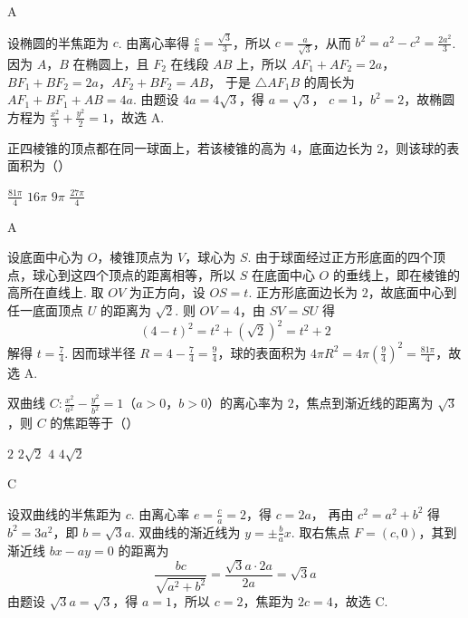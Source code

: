 \begin{answer}
A
\end{answer}

\begin{solution}
设椭圆的半焦距为 \(c\). 由离心率得
\(\frac{c}{a}=\frac{\sqrt{3}}{3}\)，所以 \(c=\frac{a}{\sqrt{3}}\)，从而
\(b^2=a^2-c^2=\frac{2a^2}{3}\). 因为 \(A\)，\(B\) 在椭圆上，且 \(F_2\) 在线段 \(AB\) 上，所以
\(AF_1+AF_2=2a\)，\(BF_1+BF_2=2a\)，\(AF_2+BF_2=AB\)，
于是 \(\triangle AF_1B\) 的周长为
\(AF_1+BF_1+AB=4a\). 由题设 \(4a=4\sqrt{3}\)，得 \(a=\sqrt{3}\)，
\(c=1\)，\(b^2=2\)，故椭圆方程为
\(\frac{x^2}{3}+\frac{y^2}{2}=1\)，故选 A.
\end{solution}

\begin{problem}
正四棱锥的顶点都在同一球面上，若该棱锥的高为 \(4\)，底面边长为 \(2\)，则该球的表面积为（\quad）

\choices
    {\(\frac{81\pi}{4}\)}
    {\(16\pi\)}
    {\(9\pi\)}
    {\(\frac{27\pi}{4}\)}
\end{problem}

\begin{answer}
A
\end{answer}

\begin{solution}
设底面中心为 \(O\)，棱锥顶点为 \(V\)，球心为 \(S\). 由于球面经过正方形底面的四个顶点，球心到这四个顶点的距离相等，所以 \(S\) 在底面中心 \(O\) 的垂线上，即在棱锥的高所在直线上. 取 \(OV\) 为正方向，设 \(OS=t\). 正方形底面边长为 \(2\)，故底面中心到任一底面顶点 \(U\) 的距离为
\(\sqrt{2}\). 则 \(OV=4\)，由 \(SV=SU\) 得
\[
(4-t)^2=t^2+(\sqrt{2})^2=t^2+2
\]
解得 \(t=\frac{7}{4}\). 因而球半径
\(R=4-\frac{7}{4}=\frac{9}{4}\)，球的表面积为
\(4\pi R^2=4\pi\left(\frac{9}{4}\right)^2=\frac{81\pi}{4}\)，故选 A.
\end{solution}

\begin{problem}
双曲线 \(C: \frac{x^2}{a^2} - \frac{y^2}{b^2} = 1\)（\(a > 0\)，\(b > 0\)）的离心率为 \(2\)，焦点到渐近线的距离为 \(\sqrt{3}\)，则 \(C\) 的焦距等于（\quad）

\choices
    {\(2\)}
    {\(2\sqrt{2}\)}
    {\(4\)}
    {\(4 \sqrt{2}\)}
\end{problem}

\begin{answer}
C
\end{answer}

\begin{solution}
设双曲线的半焦距为 \(c\). 由离心率 \(e=\frac{c}{a}=2\)，得 \(c=2a\)，
再由 \(c^2=a^2+b^2\) 得 \(b^2=3a^2\)，即 \(b=\sqrt{3}a\).
双曲线的渐近线为 \(y=\pm\frac{b}{a}x\). 取右焦点 \(F=(c,0)\)，其到渐近线
\(bx-ay=0\) 的距离为
\[
\frac{bc}{\sqrt{a^2+b^2}}=\frac{\sqrt{3}a\cdot2a}{2a}=\sqrt{3}a
\]
由题设 \(\sqrt{3}a=\sqrt{3}\)，得 \(a=1\)，所以 \(c=2\)，焦距为 \(2c=4\)，故选 C.
\end{solution}

